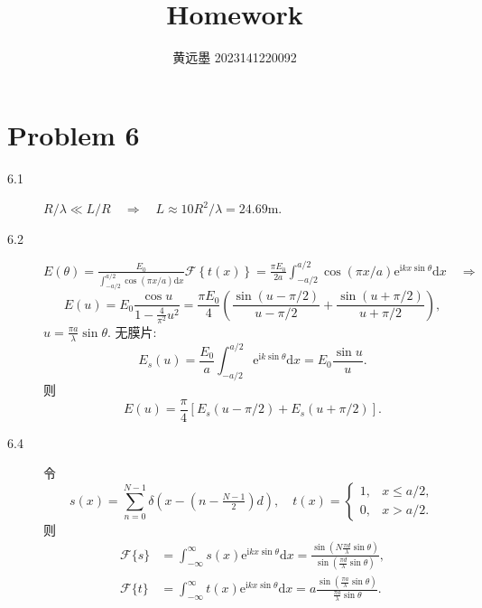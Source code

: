 \documentclass[11pt, twoside]{article}   	%
\title{Homework}
\author{黄远墨 2023141220092}
\date{}							%
\theoremstyle{plain}
\theoremstyle{definition}
\begin{document}
	\thispagestyle{fancy}
	\section{Problem 6}
	
	\begin{description}
		\item[6.1] $R / \lambda \ll L / R \quad \Rightarrow \quad L \approx 10 R^2 / \lambda = 24.69
			\mathrm{m}$.
		\item[6.2] $E(\theta) = \frac{E_0}{\int_{-a/2}^{a/2} \cos(\pi x / a) \mathrm{d}x} \mathcal F \left\{ t(x) \right\} = \frac{\pi E_0}{2 a} \int_{-a/2}^{a/2} \cos(\pi x / a) \mathrm e^{\mathrm{i} k x \sin\theta} \mathrm{d}x \quad \Rightarrow$
			\begin{equation}
				E(u) = E_0 \frac{\cos u}{1 - \frac{4}{\pi^2} u^2} = \frac{\pi E_0}{4} \left( \frac{\sin(u - \pi/2)}{u - \pi / 2} + \frac{\sin(u + \pi / 2)}{u + \pi / 2} \right),
			\end{equation}
			$u = \frac{\pi a}{\lambda} \sin\theta$. 无膜片:
			\begin{equation}
				E_s(u) = \frac{E_0}{a} \int_{-a/2}^{a/2} \mathrm e^{\mathrm{i} k \sin\theta} \mathrm{d}x = E_0 \frac{\sin u}{u}.
			\end{equation}
			则
			\begin{equation}
				E(u) = \frac{\pi}{4} \left[ E_s(u - \pi / 2) + E_s(u + \pi / 2) \right].
			\end{equation}
		\item[6.4] 令
			\begin{equation}
				s(x) = \sum_{n = 0}^{N-1} \delta(x - (n - \tfrac{N - 1}{2}) d), \quad
				t(x) =
				\begin{cases}
					1, & x \leq a / 2,\\
					0, & x > a / 2.
				\end{cases}
			\end{equation}
			则
			\begin{align}
				\mathcal F\{s\} &= \int_{-\infty}^{\infty} s(x) \mathrm e^{\mathrm{i}kx\sin\theta} \mathrm{d}x = \frac{\sin\left(N \frac{\pi d}{\lambda} \sin\theta \right)}{\sin\left( \frac{\pi d}{\lambda} \sin\theta \right)},\\
				\mathcal F\{t\} &= \int_{-\infty}^{\infty} t(x) \mathrm e^{\mathrm{i}kx\sin\theta} \mathrm{d}x = a \frac{\sin\left( \frac{\pi a}{\lambda} \sin\theta \right)}{\frac{\pi a}{\lambda} \sin\theta}.

\end{align}
\end{description}
\end{document}
